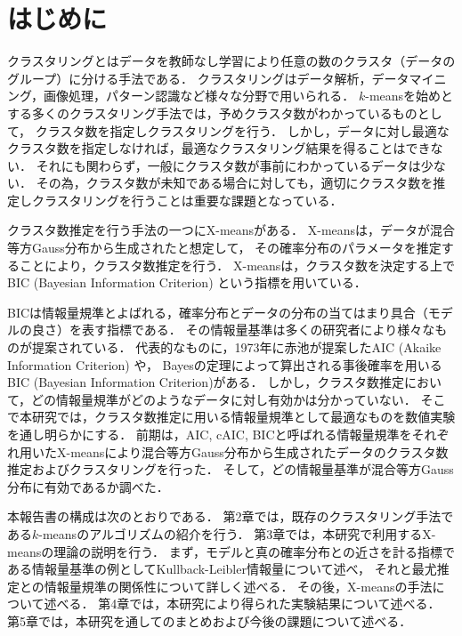 \section{はじめに}
クラスタリングとはデータを教師なし学習により任意の数のクラスタ（データのグループ）に分ける手法である．
クラスタリングはデータ解析，データマイニング，画像処理，パターン認識など様々な分野で用いられる．
$k$-meansを始めとする多くのクラスタリング手法では，予めクラスタ数がわかっているものとして，
クラスタ数を指定しクラスタリングを行う．
しかし，データに対し最適なクラスタ数を指定しなければ，最適なクラスタリング結果を得ることはできない．
それにも関わらず，一般にクラスタ数が事前にわかっているデータは少ない．
その為，クラスタ数が未知である場合に対しても，適切にクラスタ数を推定しクラスタリングを行うことは重要な課題となっている．

クラスタ数推定を行う手法の一つにX-meansがある．
X-meansは，データが混合等方Gauss分布から生成されたと想定して，
その確率分布のパラメータを推定することにより，クラスタ数推定を行う．
X-meansは，クラスタ数を決定する上でBIC (Bayesian Information Criterion) という指標を用いている．

BICは情報量規準とよばれる，確率分布とデータの分布の当てはまり具合（モデルの良さ）を表す指標である．
その情報量基準は多くの研究者により様々なものが提案されている．
代表的なものに，1973年に赤池が提案したAIC (Akaike Information Criterion) や，
Bayesの定理によって算出される事後確率を用いるBIC (Bayesian Information Criterion)がある．
しかし，クラスタ数推定において，どの情報量規準がどのようなデータに対し有効かは分かっていない．
そこで本研究では，クラスタ数推定に用いる情報量規準として最適なものを数値実験を通し明らかにする．
前期は，AIC, cAIC, BICと呼ばれる情報量規準をそれぞれ用いたX-meansにより混合等方Gauss分布から生成されたデータのクラスタ数推定およびクラスタリングを行った．
そして，どの情報量基準が混合等方Gauss分布に有効であるか調べた．

本報告書の構成は次のとおりである．
第2章では，既存のクラスタリング手法である$k$-meansのアルゴリズムの紹介を行う．
第3章では，本研究で利用するX-meansの理論の説明を行う．
まず，モデルと真の確率分布との近さを計る指標である情報量基準の例としてKullback-Leibler情報量について述べ，
それと最尤推定との情報量規準の関係性について詳しく述べる．
その後，X-meansの手法について述べる．
第4章では，本研究により得られた実験結果について述べる．
第5章では，本研究を通してのまとめおよび今後の課題について述べる．
